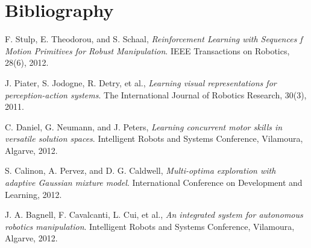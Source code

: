 \documentclass[12pt]{article}
\begin{document}
\section{Bibliography}

\begin{thebibliography}{9}

  F. Stulp, E. Theodorou, and S. Schaal,
  \emph{Reinforcement Learning with Sequences f Motion Primitives for Robust Manipulation}.
  IEEE Transactions on Robotics, 
  28(6),
  2012.

  J. Piater, S. Jodogne, R. Detry, et al.,
  \emph{Learning visual representations for perception-action systems}.
  The International Journal of Robotics Research, 
  30(3),
  2011.
  
    C. Daniel, G. Neumann, and J. Peters,
    \emph{Learning concurrent motor skills in versatile solution spaces}.
    Intelligent Robots and Systems Conference, Vilamoura, Algarve,
    2012.
    
  S. Calinon, A. Pervez, and D. G. Caldwell,
  \emph{Multi-optima exploration with adaptive Gaussian mixture model}.
  International Conference on Development and Learning, 
  2012.
  
  
  J. A. Bagnell, F. Cavalcanti, L. Cui, et al.,
  \emph{An integrated system for autonomous robotics manipulation}.
  Intelligent Robots and Systems Conference, Vilamoura, Algarve, 
  2012.
  

\end{thebibliography}
\end{document}
